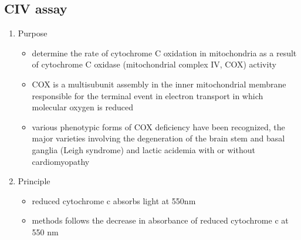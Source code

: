 \documentclass{scrartcl}
\begin{document}
\subsection{CIV assay}
\label{sec:orga3f0d13}
\begin{enumerate}
\item Purpose
\label{sec:org872a57c}
\begin{itemize}
\item determine the rate of cytochrome C oxidation in mitochondria as a
result of cytochrome C oxidase (mitochondrial complex IV, COX)
activity
\item COX is a multisubunit assembly in the inner mitochondrial membrane
responsible for the terminal event in electron transport in which
molecular oxygen is reduced
\item various phenotypic forms of COX deficiency have been recognized, the
major varieties involving the degeneration of the brain stem and
basal ganglia (Leigh syndrome) and lactic acidemia with or without
cardiomyopathy
\end{itemize}

\item Principle
\label{sec:org0c8450a}
\begin{itemize}
\item reduced cytochrome c absorbs light at 550nm
\item methods follows the decrease in absorbance of reduced cytochrome c
at 550 nm
\end{itemize}

{\small{}}
\end{enumerate}
\end{document}
